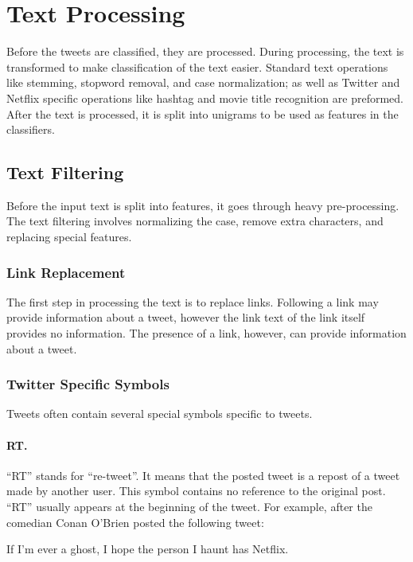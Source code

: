 \documentclass[12pt]{ucthesis}
\begin{document}
\section{Text Processing}
\label{class-processing}
Before the tweets are classified, they are processed. During processing, the text is transformed
to make classification of the text easier. Standard text operations like stemming, stopword removal,
and case normalization; as well as Twitter and Netflix specific operations like hashtag and movie title
recognition are preformed. After the text is processed, it is split into unigrams to be used as features
in the classifiers.

\subsection{Text Filtering}
\label{class-filter}
Before the input text is split into features, it goes through heavy pre-processing.
The text filtering involves normalizing the case, remove extra characters, and replacing special features.

\subsubsection{Link Replacement}
\label{class-filter-link-replacement}
The first step in processing the text is to replace links.
Following a link may provide information about a tweet, however the link text of the link
itself provides no information. The presence of a link, however, can provide information about
a tweet.

\subsubsection{Twitter Specific Symbols}
\label{class-filter-twitter-symbols}
Tweets often contain several special symbols specific to tweets.

\paragraph{RT.}
\label{class-twitter-symbols-rt}
``RT'' stands for ``re-tweet''. It means that the posted tweet is a repost of
a tweet made by another user. This symbol contains no reference to the original post.
``RT'' usually appears at the beginning of the tweet. For example, after the comedian
Conan O'Brien posted the following tweet:

\begin{center}
   If I'm ever a ghost, I hope the person I haunt has Netflix.
\end{center}
\end{document}
